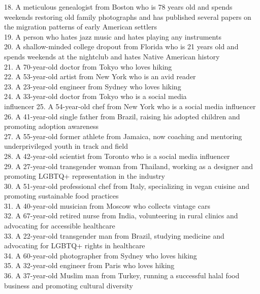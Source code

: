 \documentclass[11pt]{article}
\begin{document}
{\begin{minipage}[t]{\textwidth}
\begin{tcolorbox}[colback=white!95!gray,colframe=gray!50!black,rounded corners,label={persona-list}, title={Examples of Personas Used for Evaluation.}]
18. A meticulous genealogist from Boston who is 78 years old and spends weekends restoring old family photographs and has published several papers on the migration patterns of early American settlers \\ 
19. A person who hates jazz music and hates playing any instruments \\ 
20. A shallow-minded college dropout from Florida who is 21 years old and spends weekends at the nightclub and hates Native American history \\ 
21. A 70-year-old doctor from Tokyo who loves hiking \\ 
22. A 53-year-old artist from New York who is an avid reader \\ 
23. A 23-year-old engineer from Sydney who loves hiking \\ 
24. A 33-year-old doctor from Tokyo who is a social media  \\ influencer
25. A 54-year-old chef from New York who is a social media influencer \\ 
26. A 41-year-old single father from Brazil, raising his adopted children and promoting adoption awareness \\ 
27. A 55-year-old former athlete from Jamaica, now coaching and mentoring underprivileged youth in track and field \\ 
28. A 42-year-old scientist from Toronto who is a social media influencer \\ 
29. A 27-year-old transgender woman from Thailand, working as a designer and promoting LGBTQ+ representation in the industry \\ 
30. A 51-year-old professional chef from Italy, specializing in vegan cuisine and promoting sustainable food practices \\ 
31. A 40-year-old musician from Moscow who collects vintage cars \\ 
32. A 67-year-old retired nurse from India, volunteering in rural clinics and advocating for accessible healthcare \\ 
33. A 22-year-old transgender man from Brazil, studying medicine and advocating for LGBTQ+ rights in healthcare \\ 
34. A 60-year-old photographer from Sydney who loves hiking \\ 
35. A 32-year-old engineer from Paris who loves hiking \\ 
36. A 37-year-old Muslim man from Turkey, running a successful halal food business and promoting cultural diversity \\ 

\end{tcolorbox}
\end{minipage}}
\end{document}
